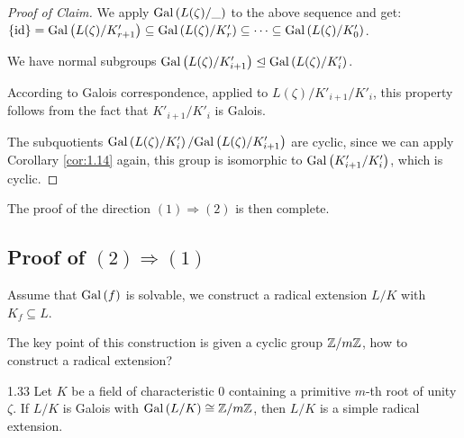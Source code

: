 \documentclass[twoside = false,	%
		headsepline,		%
		parskip = true,
		]{scrbook}						%
\begin{document}
    \begin{proof}[Proof of Claim]
        We apply $\mathrm{Gal}\left( L(\zeta)/\_\right)$ to the above sequence and get:
        $\{\mathrm{id}\} = \mathrm{Gal}\left( L(\zeta)/K'_{r+1}\right) \subseteq \mathrm{Gal}\left( L(\zeta)/K'_r\right) \subseteq \dots \subseteq \mathrm{Gal}\left( L(\zeta)/K'_0\right)$.
        
        We have normal subgroups $\mathrm{Gal}\left( L(\zeta)/K'_{i+1}\right) \trianglelefteq \mathrm{Gal}\left( L(\zeta)/K'_i\right)$.
        
        According to Galois correspondence, applied to $L(\zeta)/K'_{i+1}/K'_i$, this property follows from the fact that $K'_{i+1}/K'_i$ is Galois.
        
        The subquotients $\mathrm{Gal}\left( L(\zeta)/K'_i\right)/\mathrm{Gal}\left( L(\zeta)/K'_{i+1}\right)$ are cyclic, since we can apply Corollary \ref{cor:1.14} again, this group is isomorphic to $\mathrm{Gal}\left( K'_{i+1}/K'_i\right)$, which is cyclic.
        
    \end{proof}
    
    The proof of the direction $(1) \Rightarrow (2)$ is then complete.
    
    \subsection*{Proof of $(2)\Rightarrow (1)$} 
    Assume that $\mathrm{Gal}\left( f\right)$ is solvable, we construct a radical extension $L/K$ with $K_f \subseteq L$.
    
    The key point of this construction is given a cyclic group $\mathbb Z/m\mathbb Z$, how to construct a radical extension?
    
    \begin{lemma}{}{1.33}
        Let $K$ be a field of characteristic $0$ containing a primitive $m$-th root of unity $\zeta$. If $L/K$ is Galois with $\mathrm{Gal}\left( L/K\right) \cong \mathbb Z/m\mathbb Z$, then $L/K$ is a simple radical extension.
    \end{lemma}
    
\end{document}
